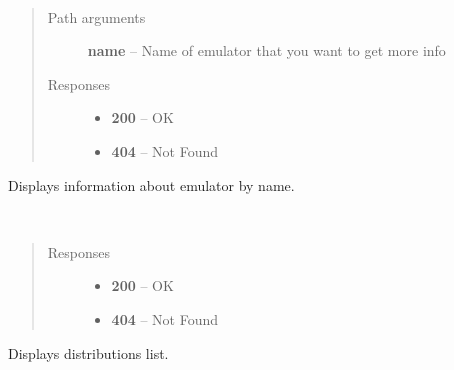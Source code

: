 \documentclass[letterpaper,10pt,english]{sphinxmanual}
\begin{document}

\begin{fulllineitems}
\label{01_how_to_use_it:method-get-emulators-name-}~\begin{quote}\begin{description}
\item[{Path arguments}] \leavevmode
\textbf{name} -- Name of emulator that you want to get more info

\item[{Responses}] \leavevmode\begin{itemize}
\item {} 
\textbf{200} -- OK

\item {} 
\textbf{404} -- Not Found

\end{itemize}

\end{description}\end{quote}

Displays information about emulator by name.

\end{fulllineitems}


\begin{fulllineitems}
\label{01_how_to_use_it:method-get-distributions}~\begin{quote}\begin{description}
\item[{Responses}] \leavevmode\begin{itemize}
\item {} 
\textbf{200} -- OK

\item {} 
\textbf{404} -- Not Found

\end{itemize}

\end{description}\end{quote}

Displays distributions list.

\end{fulllineitems}

\end{document}
